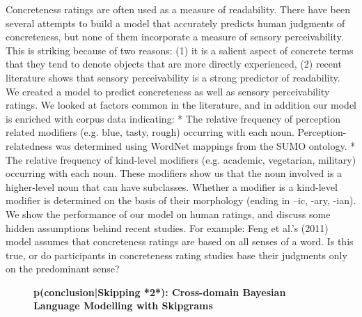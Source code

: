 \documentclass[10pt, a4paper, twopage, headinclude, footinclude, BCOR5mm]{scrartcl}
\begin{document}
        \begin{table}[t!]
    \end{table}

\noindent
Concreteness ratings are often used as a measure of readability. There have been several attempts to build a model that accurately predicts human judgments of concreteness, but none of them incorporate a measure of sensory perceivability. This is striking because of two reasons: (1) it is a salient aspect of concrete terms that they tend to denote objects that are more directly experienced, (2) recent literature shows that sensory perceivability is a strong predictor of readability.  We created a model to predict concreteness as well as sensory perceivability ratings. We looked at factors common in the literature, and in addition our model is enriched with corpus data indicating: * The relative frequency of perception related modifiers (e.g. blue, tasty, rough) occurring with each noun. Perception-relatedness was determined using WordNet mappings from the SUMO ontology. * The relative frequency of kind-level modifiers (e.g. academic, vegetarian, military) occurring with each noun. These modifiers show us that the noun involved is a higher-level noun that can have subclasses. Whether a modifier is a kind-level modifier is determined on the basis of their morphology (ending in –ic, -ary, -ian).  We show the performance of our model on human ratings, and discuss some hidden assumptions behind recent studies. For example: Feng et al.'s (2011) model assumes that concreteness ratings are based on all senses of a word. Is this true, or do participants in concreteness rating studies base their judgments only on the predominant sense?


\newpage

\begin{figure}[t!]
\centering
\large\textbf{p(conclusion|Skipping {*2*}): Cross-domain Bayesian \\ Language Modelling with Skipgrams}
\vspace*{0.5cm}
\end{figure}
\end{document}

